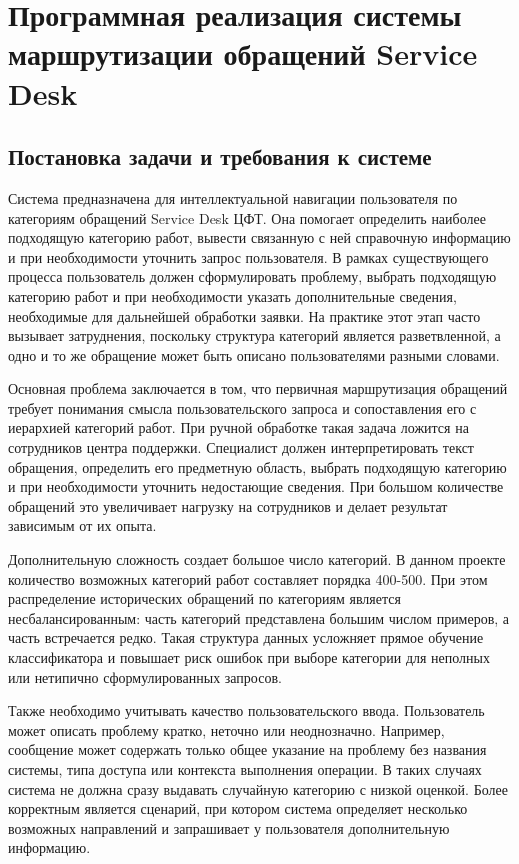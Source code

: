 \documentclass[14pt,a4paper]{extarticle}
\numberwithin{figure}{section}
\numberwithin{table}{section}
\begin{document}
\clearpage
\section{Программная реализация системы маршрутизации обращений Service Desk}

\subsection{Постановка задачи и требования к системе}

Система предназначена для интеллектуальной навигации пользователя по
категориям обращений Service Desk ЦФТ. Она помогает определить наиболее
подходящую категорию работ, вывести связанную с ней справочную
информацию и при необходимости уточнить запрос пользователя. В рамках
существующего процесса пользователь должен сформулировать проблему,
выбрать подходящую категорию работ и при необходимости указать
дополнительные сведения, необходимые для дальнейшей обработки заявки. На
практике этот этап часто вызывает затруднения, поскольку структура
категорий является разветвленной, а одно и то же обращение может быть
описано пользователями разными словами.

Основная проблема заключается в том, что первичная маршрутизация
обращений требует понимания смысла пользовательского запроса и
сопоставления его с иерархией категорий работ. При ручной обработке
такая задача ложится на сотрудников центра поддержки. Специалист должен
интерпретировать текст обращения, определить его предметную область,
выбрать подходящую категорию и при необходимости уточнить недостающие
сведения. При большом количестве обращений это увеличивает нагрузку на
сотрудников и делает результат зависимым от их опыта.

Дополнительную сложность создает большое число категорий. В данном
проекте количество возможных категорий работ составляет порядка 400-500.
При этом распределение исторических обращений по категориям является
несбалансированным: часть категорий представлена большим числом
примеров, а часть встречается редко. Такая структура данных усложняет
прямое обучение классификатора и повышает риск ошибок при выборе
категории для неполных или нетипично сформулированных запросов.

Также необходимо учитывать качество пользовательского ввода.
Пользователь может описать проблему кратко, неточно или неоднозначно.
Например, сообщение может содержать только общее указание на проблему
без названия системы, типа доступа или контекста выполнения операции. В
таких случаях система не должна сразу выдавать случайную категорию с
низкой оценкой. Более корректным является сценарий, при котором
система определяет несколько возможных направлений и запрашивает у
пользователя дополнительную информацию.
\end{document}
